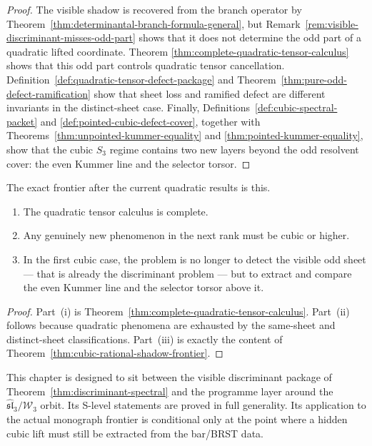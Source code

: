 \begin{proof}
The visible shadow is recovered from the branch operator by
Theorem~\ref{thm:determinantal-branch-formula-general}, but
Remark~\ref{rem:visible-discriminant-misses-odd-part} shows that it does not
determine the odd part of a quadratic lifted coordinate.  Theorem
\ref{thm:complete-quadratic-tensor-calculus} shows that this odd part controls
quadratic tensor cancellation.  Definition~\ref{def:quadratic-tensor-defect-package}
and Theorem~\ref{thm:pure-odd-defect-ramification} show that sheet loss and
ramified defect are different invariants in the distinct-sheet case.  Finally,
Definitions~\ref{def:cubic-spectral-packet} and
\ref{def:pointed-cubic-defect-cover}, together with
Theorems~\ref{thm:unpointed-kummer-equality} and
\ref{thm:pointed-kummer-equality}, show that the cubic $S_3$ regime contains two
new layers beyond the odd resolvent cover: the even Kummer line and the selector
torsor.
\end{proof}

\begin{corollary}
\label{cor:platonic-form-frontier}
The exact frontier after the current quadratic results is this.
\begin{enumerate}[label=\textup{(\roman*)}]
\item The quadratic tensor calculus is complete.
\item Any genuinely new phenomenon in the next rank must be cubic or higher.
\item In the first cubic case, the problem is no longer to detect the visible
odd sheet --- that is already the discriminant problem --- but to extract and
compare the even Kummer line and the selector torsor above it.
\end{enumerate}
\end{corollary}

\begin{proof}
Part~(i) is Theorem~\ref{thm:complete-quadratic-tensor-calculus}.  Part~(ii)
follows because quadratic phenomena are exhausted by the same-sheet and
distinct-sheet classifications.  Part~(iii) is exactly the content of
Theorem~\ref{thm:cubic-rational-shadow-frontier}.
\end{proof}

\begin{remark}
\label{rem:integration-point-monograph}
This chapter is designed to sit between the visible discriminant package of
Theorem~\ref{thm:discriminant-spectral} and the programme layer around the
$\widehat{\mathfrak{sl}}_3/\mathcal W_3$ orbit.  Its S-level statements are
proved in full generality.  Its application to the actual monograph frontier is
conditional only at the point where a hidden cubic lift must still be extracted
from the bar/BRST data.
\end{remark}
